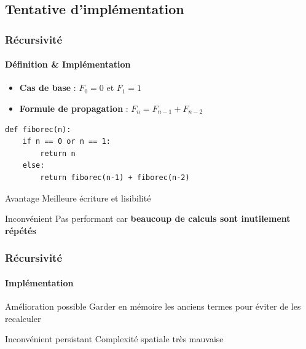 \documentclass[10pt]{beamer}
\begin{document}
\subsection{Tentative d'implémentation}
\begin{frame}[fragile]
\frametitle{Récursivité}
\framesubtitle{Définition \& Implémentation}
\begin{itemize}
\item \textbf{Cas de base} : $F_0 = 0$ et $F_1 = 1$
\item \textbf{Formule de propagation} : $F_n = F_{n-1} + F_{n-2}$
\end{itemize}
\pause
\begin{verbatim}
def fiborec(n):
    if n == 0 or n == 1:
        return n
    else:
        return fiborec(n-1) + fiborec(n-2)
\end{verbatim}
\begin{exampleblock}{Avantage}
Meilleure écriture et lisibilité
\end{exampleblock}

\begin{alertblock}{Inconvénient}
Pas performant car \textbf{beaucoup de calculs sont inutilement répétés}
\end{alertblock}
\end{frame}

\begin{frame}
\frametitle{Récursivité}
\framesubtitle{Implémentation}
\begin{block}{Amélioration possible}
Garder en mémoire les anciens termes pour éviter de les recalculer
\end{block}

\begin{alertblock}{Inconvénient persistant}
Complexité spatiale très mauvaise
\end{alertblock}
\end{frame}
\end{document}
